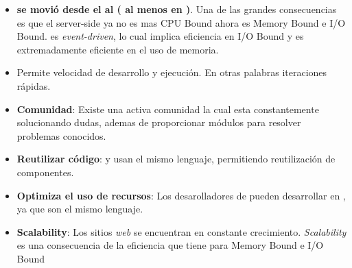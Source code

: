 \begin{itemize}
	\item \textbf{\frontend se movió desde el \serverside al \clientside( al menos en \mobile )}. Una de las grandes consecuencias es que el server-side ya no es mas CPU Bound ahora es Memory Bound e I/O Bound. \nodejs es \textit{event-driven}, lo cual implica eficiencia en I/O Bound y es extremadamente eficiente en el uso de memoria.
	\item Permite velocidad de desarrollo y ejecución. En otras palabras iteraciones rápidas.
	\item \textbf{Comunidad}: Existe una activa comunidad la cual esta constantemente solucionando dudas, ademas de proporcionar módulos para resolver problemas conocidos.
	\item \textbf{Reutilizar código}: \serverside y \clientside usan el mismo lenguaje, permitiendo reutilización de componentes.
	\item \textbf{Optimiza el uso de recursos}: Los desarolladores de \clientside pueden desarrollar en \serverside, ya que son el mismo lenguaje.
	\item \textbf{Scalability}: Los sitios \textit{web} se encuentran en constante crecimiento. \textit{Scalability} es una consecuencia de la eficiencia que tiene \nodejs para Memory Bound e I/O Bound
\end{itemize}

